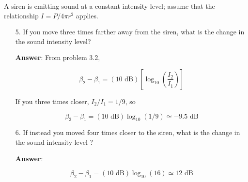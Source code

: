 \documentclass{article}
\begin{document}
\vskip 0.75pt

A siren is emitting sound at a constant intensity level; assume that the relationship $I = P/4\pi r^2$ applies.

\begin{enumerate}

  \item[5.] If you move three times farther away from the siren, what is the change in the sound intensity level?

            \ifsolutions
            \textbf{Answer}: From problem 3.2,

            $$\beta_2-\beta_1 = (10 \text{ dB})\left[\log_{10}\left(\frac{I_2}{I_1}\right)\right]$$

            If you three times closer, $I_2/I_1=1/9$, so

            $$\beta_2-\beta_1 = (10 \text{ dB})\log_{10}(1/9) \simeq -9.5\text{ dB}$$
            \else
            \vskip 96pt
            \fi

  \item[6.] If instead you moved four times closer to the siren, what is the change in the sound intensity level ?

            \ifsolutions
            \textbf{Answer}:

            $$\beta_2-\beta_1 = (10 \text{ dB})\log_{10}(16) \simeq 12\text{ dB}$$
            \else
            \vskip 96pt
            \fi

\end{enumerate}

\vskip 0.75pt
\end{document}
